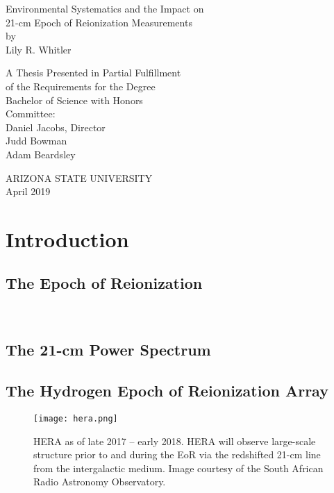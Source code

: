 \documentclass[12pt]{article}
\begin{document}
\begin{center}
	Environmental Systematics and the Impact on \\ 21-cm Epoch of Reionization Measurements \\
	by \\
	Lily R. Whitler
	
	\begin{spacing}{1}
		\vspace{0.15\textheight}
		A Thesis Presented in Partial Fulfillment \\
		of the Requirements for the Degree \\
		Bachelor of Science with Honors \\
		\vspace{0.22\textheight}
		Committee: \\
		Daniel Jacobs, Director \\
		Judd Bowman \\
		Adam Beardsley
	\end{spacing}

	\vspace{0.22\textheight}
	ARIZONA STATE UNIVERSITY \\
	April 2019
\end{center}
\thispagestyle{empty}
\newpage

\tableofcontents
\listoffigures
\listoftables
\newpage

\begin{abstract}
\end{abstract}

\section{Introduction} \label{sec:intro}
\subsection{The Epoch of Reionization} \label{subsec:eor}
\cite{morales2010} \\
\cite{pritchard2012}
\subsection{The 21-cm Power Spectrum} \label{subsec:ps}
\subsection{The Hydrogen Epoch of Reionization Array} \label{subsec:hera}
\begin{figure}[h]
	\centering
	\texttt{[image: hera.png]}
	\caption[HERA as of late 2017 -- early 2018]{HERA as of late 2017 -- early 2018. HERA will observe large-scale structure prior to and during the EoR via the redshifted 21-cm line from the intergalactic medium. Image courtesy of the South African Radio Astronomy Observatory.}
	\label{fig:hera}
\end{figure}
\cite{deboer2017}
\end{document}
